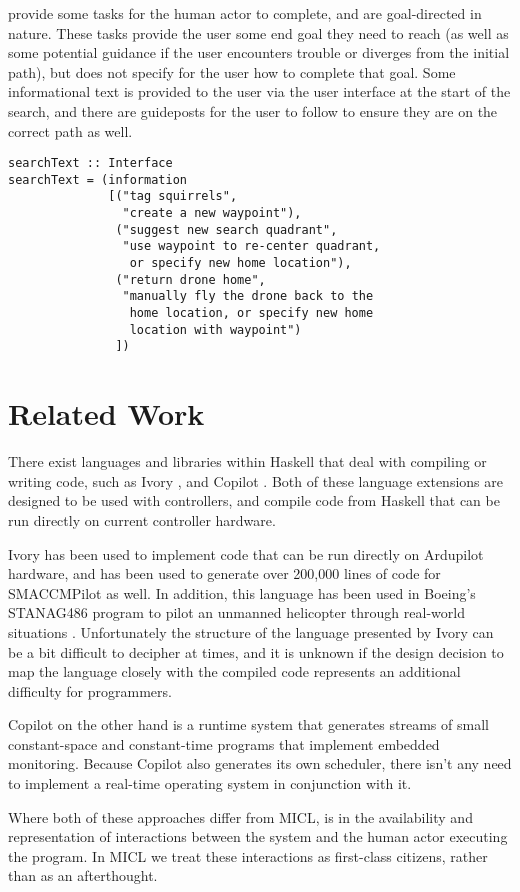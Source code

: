 \documentclass{sig-alternate-05-2015}
\begin{document}
 provide some tasks for the human actor to complete, and
are goal-directed in nature. These tasks provide the user some end goal they
need to reach (as well as some potential guidance if the user encounters
trouble or diverges from the initial path), but does not specify for the user
how to complete that goal. Some informational text is provided to the user via
the user interface at the start of the search, and there are guideposts for
the user to follow to ensure they are on the correct path as well.

\begin{lstlisting}
searchText :: Interface
searchText = (information
              [("tag squirrels",
                "create a new waypoint"),
               ("suggest new search quadrant",
                "use waypoint to re-center quadrant,
                 or specify new home location"),
               ("return drone home",
                "manually fly the drone back to the
                 home location, or specify new home
                 location with waypoint")
               ])
\end{lstlisting}


\section{Related Work}
\label{sec:related}
There exist languages and libraries within Haskell that deal with compiling or
writing  code, such as Ivory \cite{elliot2015ivory}, and Copilot
\cite{pike2010copilot}. Both of these language extensions are designed to be
used with controllers, and compile  code from Haskell that can be
run directly on current controller hardware.

Ivory has been used to implement code that can be run directly on Ardupilot
hardware, and has been used to generate over 200,000 lines of code for
SMACCMPilot as well. In addition, this language has been used in Boeing's
STANAG486 program to pilot an unmanned helicopter through real-world
situations \cite{boeing2016auto}. Unfortunately the structure of the language
presented by Ivory can be a bit difficult to decipher at times, and it is
unknown if the design decision to map the language closely with the compiled
code represents an additional difficulty for programmers.

Copilot on the other hand is a runtime system that generates streams of small
constant-space and constant-time  programs that implement embedded
monitoring. Because Copilot also generates its own scheduler, there isn't any
need to implement a real-time operating system in conjunction with it.

Where both of these approaches differ from MICL, is in the availability and
representation of interactions between the system and the human actor
executing the program. In MICL we treat these interactions as first-class
citizens, rather than as an afterthought.





\end{document}
